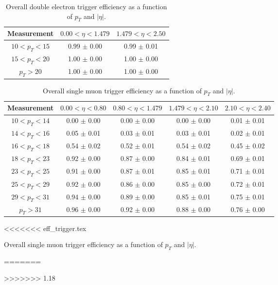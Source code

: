 %
%
%
\begin{table}[!ht]
\begin{center}
\begin{tabular}{c|c|c}
\hline
Measurement  & $0.00<\eta<1.479$  & $1.479<\eta<2.50$  \\ 
\hline
$  10<p_T<  15$ & 0.99 $\pm$ 0.00  & 0.99 $\pm$ 0.01  \\ \hline 
$  15<p_T<  20$ & 1.00 $\pm$ 0.00  & 1.00 $\pm$ 0.00  \\ \hline 
$  p_T>     20$ & 1.00 $\pm$ 0.00  & 1.00 $\pm$ 0.00  \\ \hline 
\end{tabular}
\caption{Overall double electron trigger efficiency as a function of $p_T$ and $|\eta|$.}
\label{tab:eff_trigger_ee}
\end{center}
\end{table}
%
%
%
\begin{table}[!ht]
\begin{center}
\begin{tabular}{c|c|c|c|c}
\hline
Measurement  & $0.00<\eta<0.80$  & $0.80<\eta<1.479$  & $1.479<\eta<2.10$  & $2.10<\eta<2.40$  \\ 
\hline
$  10<p_T<  14$ & 0.00 $\pm$ 0.00  & 0.00 $\pm$ 0.00  & 0.00 $\pm$ 0.00  & 0.01 $\pm$ 0.01  \\ \hline 
$  14<p_T<  16$ & 0.05 $\pm$ 0.01  & 0.03 $\pm$ 0.01  & 0.03 $\pm$ 0.01  & 0.02 $\pm$ 0.01  \\ \hline 
$  16<p_T<  18$ & 0.54 $\pm$ 0.02  & 0.52 $\pm$ 0.01  & 0.54 $\pm$ 0.02  & 0.45 $\pm$ 0.02  \\ \hline 
$  18<p_T<  23$ & 0.92 $\pm$ 0.00  & 0.87 $\pm$ 0.00  & 0.84 $\pm$ 0.01  & 0.69 $\pm$ 0.01  \\ \hline 
$  23<p_T<  25$ & 0.91 $\pm$ 0.00  & 0.87 $\pm$ 0.01  & 0.85 $\pm$ 0.01  & 0.71 $\pm$ 0.01  \\ \hline 
$  25<p_T<  29$ & 0.92 $\pm$ 0.00  & 0.86 $\pm$ 0.00  & 0.85 $\pm$ 0.00  & 0.72 $\pm$ 0.01  \\ \hline 
$  29<p_T<  31$ & 0.94 $\pm$ 0.00  & 0.89 $\pm$ 0.00  & 0.85 $\pm$ 0.01  & 0.75 $\pm$ 0.01  \\ \hline 
$  p_T>     31$ & 0.96 $\pm$ 0.00  & 0.92 $\pm$ 0.00  & 0.88 $\pm$ 0.00  & 0.76 $\pm$ 0.00  \\ \hline 
\end{tabular}
<<<<<<< eff_trigger.tex
\caption{Overall single muon trigger efficiency as a function of $p_T$ and $|\eta|$.}
\label{tab:eff_trigger_mm}
=======
\caption{Overall single muon trigger efficiency as a function of $p_T$ and $|\eta|$.}
\label{tab:eff_trigger_m}
>>>>>>> 1.18
\end{center}
\end{table}

